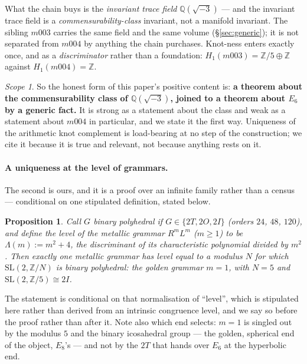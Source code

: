 \documentclass[11pt,a4paper]{article}
\newtheorem{proposition}[theorem]{Proposition}
\theoremstyle{definition}
\theoremstyle{remark}
\newtheorem{scopenote}{Scope}
\newcommand{\Q}{\mathbb{Q}}
\newcommand{\Z}{\mathbb{Z}}
\begin{document}
What the chain buys is the \emph{invariant trace field} $\Q(\sqrt{-3})$ --- and the invariant trace field is a
\emph{commensurability-class} invariant, not a manifold invariant. The sibling $m003$ carries the
same field and the same volume (\S\ref{sec:generic}); it is not separated from $m004$ by anything the
chain purchases. Knot-ness enters exactly once, and as a \emph{discriminator} rather than a
foundation: $H_1(m003) = \Z/5 \oplus \Z$ against $H_1(m004) = \Z$.

\begin{scopenote}
So the honest form of this paper's positive content is: \textbf{a theorem about the commensurability
class of $\Q(\sqrt{-3})$, joined to a theorem about $E_6$ by a generic fact.} It is strong as a
statement about the class and weak as a statement about $m004$ in particular, and we state it the
first way. Uniqueness of the arithmetic knot complement is load-bearing at no step of the
construction; we cite it because it is true and relevant, not because anything rests on it.
\end{scopenote}

\paragraph{A uniqueness at the level of grammars.} The second is ours, and it is a proof over an
infinite family rather than a census --- conditional on one stipulated definition, stated below.

\begin{proposition}\label{thm:golden}
Call $G$ \emph{binary polyhedral} if $G \in \{2T, 2O, 2I\}$ (orders $24$, $48$, $120$), and define the \emph{level} of the
metallic grammar $R^mL^m$ ($m \ge 1$) to be $\Lambda(m) := m^2 + 4$, the discriminant of its characteristic polynomial divided
by $m^2$. Then exactly one metallic grammar has level equal to a modulus $N$ for which $\mathrm{SL}(2,\Z/N)$ is binary
polyhedral: the golden grammar $m = 1$, with $N = 5$ and $\mathrm{SL}(2,\Z/5) \cong 2I$.
\end{proposition}

\noindent The statement is conditional on that normalisation of ``level'', which is stipulated here rather than derived from
an intrinsic congruence level, and we say so before the proof rather than after it. Note also which end selects: $m = 1$ is
singled out by the modulus $5$ and the binary icosahedral group --- the golden, spherical end of the object, $E_8$'s --- and
not by the $2T$ that hands over $E_6$ at the hyperbolic end.
\end{document}
